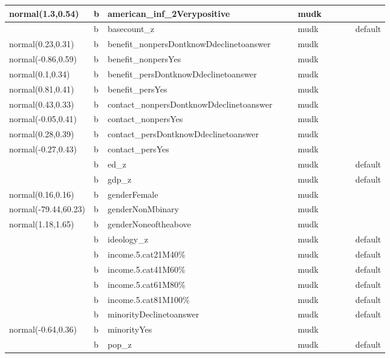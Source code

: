 \documentclass[
]{book}
\theoremstyle{definition}
\theoremstyle{definition}
\theoremstyle{definition}
\theoremstyle{definition}
\theoremstyle{remark}
\begin{document}
\begin{table}
\begin{tabular}[t]{l|l|l|l|l|l|l|l|l|l}
\hline
normal(1.3,0.54) & b & american\_inf\_2Verypositive &  &  & mudk &  &  &  & \\
\hline
 & b & basecount\_z &  &  & mudk &  &  &  & default\\
\hline
normal(0.23,0.31) & b & benefit\_nonpersDontknowDdeclinetoanswer &  &  & mudk &  &  &  & \\
\hline
normal(-0.86,0.59) & b & benefit\_nonpersYes &  &  & mudk &  &  &  & \\
\hline
normal(0.1,0.34) & b & benefit\_persDontknowDdeclinetoanswer &  &  & mudk &  &  &  & \\
\hline
normal(0.81,0.41) & b & benefit\_persYes &  &  & mudk &  &  &  & \\
\hline
normal(0.43,0.33) & b & contact\_nonpersDontknowDdeclinetoanswer &  &  & mudk &  &  &  & \\
\hline
normal(-0.05,0.41) & b & contact\_nonpersYes &  &  & mudk &  &  &  & \\
\hline
normal(0.28,0.39) & b & contact\_persDontknowDdeclinetoanswer &  &  & mudk &  &  &  & \\
\hline
normal(-0.27,0.43) & b & contact\_persYes &  &  & mudk &  &  &  & \\
\hline
 & b & ed\_z &  &  & mudk &  &  &  & default\\
\hline
 & b & gdp\_z &  &  & mudk &  &  &  & default\\
\hline
normal(0.16,0.16) & b & genderFemale &  &  & mudk &  &  &  & \\
\hline
normal(-79.44,60.23) & b & genderNonMbinary &  &  & mudk &  &  &  & \\
\hline
normal(1.18,1.65) & b & genderNoneoftheabove &  &  & mudk &  &  &  & \\
\hline
 & b & ideology\_z &  &  & mudk &  &  &  & default\\
\hline
 & b & income.5.cat21M40\% &  &  & mudk &  &  &  & default\\
\hline
 & b & income.5.cat41M60\% &  &  & mudk &  &  &  & default\\
\hline
 & b & income.5.cat61M80\% &  &  & mudk &  &  &  & default\\
\hline
 & b & income.5.cat81M100\% &  &  & mudk &  &  &  & default\\
\hline
 & b & minorityDeclinetoanswer &  &  & mudk &  &  &  & default\\
\hline
normal(-0.64,0.36) & b & minorityYes &  &  & mudk &  &  &  & \\
\hline
 & b & pop\_z &  &  & mudk &  &  &  & default\\

\end{tabular}
\end{table}
\end{document}
